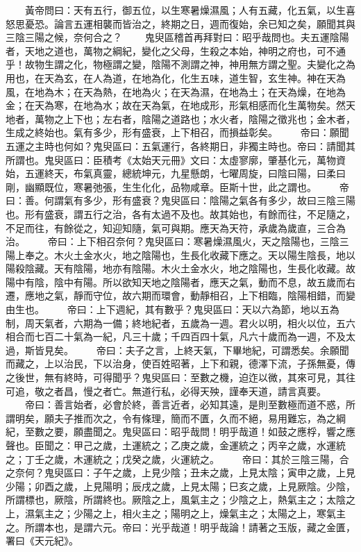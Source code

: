 　　黃帝問曰：天有五行，御五位，以生寒暑燥濕風；人有五藏，化五氣，以生喜怒思憂恐。論言五運相襲而皆治之，終期之日，週而復始，余已知之矣，願聞其與三陰三陽之候，奈何合之？
　　鬼臾區稽首再拜對曰：昭乎哉問也。夫五運陰陽者，天地之道也，萬物之綱紀，變化之父母，生殺之本始，神明之府也，可不通乎！故物生謂之化，物極謂之變，陰陽不測謂之神，神用無方謂之聖。夫變化之為用也，在天為玄，在人為道，在地為化，化生五味，道生智，玄生神。神在天為風，在地為木；在天為熱，在地為火；在天為濕，在地為土；在天為燥，在地為金；在天為寒，在地為水；故在天為氣，在地成形，形氣相感而化生萬物矣。然天地者，萬物之上下也；左右者，陰陽之道路也；水火者，陰陽之徵兆也；金木者，生成之終始也。氣有多少，形有盛衰，上下相召，而損益彰矣。
　　帝曰：願聞五運之主時也何如？鬼臾區曰：五氣運行，各終期日，非獨主時也。帝曰：請聞其所謂也。鬼臾區曰：臣積考《太始天元冊》文曰：太虛寥廓，肇基化元，萬物資始，五運終天，布氣真靈，總統坤元，九星懸朗，七曜周旋，曰陰曰陽，曰柔曰剛，幽顯既位，寒暑弛張，生生化化，品物咸章。臣斯十世，此之謂也。
　　帝曰：善。何謂氣有多少，形有盛衰？鬼臾區曰：陰陽之氣各有多少，故曰三陰三陽也。形有盛衰，謂五行之治，各有太過不及也。故其始也，有餘而往，不足隨之，不足而往，有餘從之，知迎知隨，氣可與期。應天為天符，承歲為歲直，三合為治。
　　帝曰：上下相召奈何？鬼臾區曰：寒暑燥濕風火，天之陰陽也，三陰三陽上奉之。木火土金水火，地之陰陽也，生長化收藏下應之。天以陽生陰長，地以陽殺陰藏。天有陰陽，地亦有陰陽。木火土金水火，地之陰陽也，生長化收藏。故陽中有陰，陰中有陽。所以欲知天地之陰陽者，應天之氣，動而不息，故五歲而右遷，應地之氣，靜而守位，故六期而環會，動靜相召，上下相臨，陰陽相錯，而變由生也。
　　帝曰：上下週紀，其有數乎？鬼臾區曰：天以六為節，地以五為制，周天氣者，六期為一備；終地紀者，五歲為一週。君火以明，相火以位，五六相合而七百二十氣為一紀，凡三十歲；千四百四十氣，凡六十歲而為一週，不及太過，斯皆見矣。
　　帝曰：夫子之言，上終天氣，下畢地紀，可謂悉矣。余願聞而藏之，上以治民，下以治身，使百姓昭著，上下和親，德澤下流，子孫無憂，傳之後世，無有終時，可得聞乎？鬼臾區曰：至數之機，迫迮以微，其來可見，其往可追，敬之者昌，慢之者亡。無道行私，必得天殃，謹奉天道，請言真要。
　　帝曰：善言始者，必會於終，善言近者，必知其遠，是則至數極而道不惑，所謂明矣，願夫子推而次之，令有條理，簡而不匱，久而不絕，易用難忘，為之綱紀，至數之要，願盡聞之。鬼臾區曰：昭乎哉問！明乎哉道！如鼓之應桴，響之應聲也。臣聞之：甲己之歲，土運統之；乙庚之歲，金運統之；丙辛之歲，水運統之；丁壬之歲，木運統之；戊癸之歲，火運統之。
　　帝曰：其於三陰三陽，合之奈何？鬼臾區曰：子午之歲，上見少陰；丑未之歲，上見太陰；寅申之歲，上見少陽；卯酉之歲，上見陽明；辰戌之歲，上見太陽；巳亥之歲，上見厥陰。少陰，所謂標也，厥陰，所謂終也。厥陰之上，風氣主之；少陰之上，熱氣主之；太陰之上，濕氣主之；少陽之上，相火主之；陽明之上，燥氣主之；太陽之上，寒氣主之。所謂本也，是謂六元。帝曰：光乎哉道！明乎哉論！請著之玉版，藏之金匱，署曰《天元紀》。


